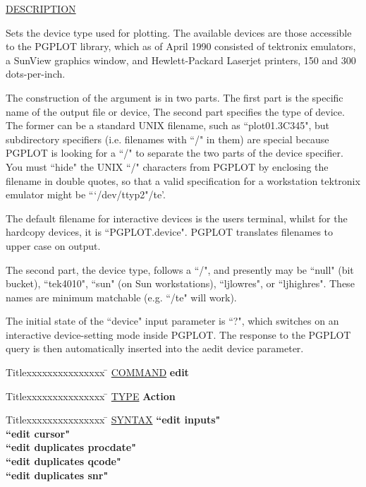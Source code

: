 \underline{DESCRIPTION}
\begin{list}{}{\setlength{\leftmargin}{0.5in}
     \setlength{\rightmargin}{0in}}
\item
Sets the device type used for plotting.  The available devices
are those accessible to the PGPLOT library, which as of April
1990 consisted of tektronix emulators, a SunView graphics window,
and Hewlett-Packard Laserjet printers, 150 and 300 dots-per-inch.
\item
The construction of the argument is in two parts.  The first
part is the specific name of the output file or device,  The
second part specifies the type of device.  The former can
be a standard UNIX filename, such as ``plot01.3C345", but 
subdirectory specifiers (i.e. filenames with ``/" in them) are
special because PGPLOT is looking for a ``/" to separate
the two parts of the device specifier.  You must ``hide" the
UNIX ``/" characters from PGPLOT by enclosing the filename in
double quotes, so that a valid specification for a workstation
tektronix emulator might be ```/dev/ttyp2"/te'.
\item
The default filename for interactive devices is the users
terminal, whilst for the hardcopy devices, it is ``PGPLOT.device".
PGPLOT translates filenames to upper case on output.
\item
The second part, the device type, follows a ``/", and presently
may be ``null" (bit bucket), ``tek4010", ``sun" (on Sun workstations), 
``ljlowres", or ``ljhighres". These names are minimum matchable 
(e.g. ``/te" will work).  
\item
The initial state of the ``device" input parameter is ``?", which
switches on an interactive device-setting mode inside PGPLOT.  The
response to the PGPLOT query is then automatically inserted into
the aedit device parameter.
\end{list}
\vspace{.2in}

\begin{tabbing}
Titlexxxxxxxxxxxxxxx \= \kill
\underline{COMMAND} \> {\bf 	edit} \\
\end{tabbing}

\begin{tabbing}
Titlexxxxxxxxxxxxxxx \= \kill
\underline{TYPE} \> {\bf 		Action} \\
\end{tabbing}

\begin{tabbing}
Titlexxxxxxxxxxxxxxx \= \kill
\underline{SYNTAX} \> {\bf 		``edit inputs"} \\
\> {\bf 		``edit cursor"} \\
\> {\bf 		``edit duplicates procdate"} \\
\> {\bf 		``edit duplicates qcode"} \\
\> {\bf 		``edit duplicates snr"} \\
\end{tabbing}

